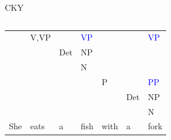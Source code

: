 \documentclass[
	hyperref={unicode},
	xcolor={svgnames, table},
	aspectratio=169,
	french,
]{beamer}
\begin{document}
\begin{frame}{CKY}
\begin{columns}
\begin{column}{0.65\textwidth}
{\begin{table}[]
\begin{tabular}{lllllll}
\multicolumn{1}{l|}{}    & \multicolumn{1}{l|}{\small{V,VP}} & \multicolumn{1}{l|}{}    & \multicolumn{1}{l|}{\textcolor{blue}{VP}} & \multicolumn{1}{l|}{}  & \multicolumn{1}{l|}{}    & \multicolumn{1}{l|}{\textcolor{blue}{VP}}                       \\ \cline{2-7} 
												 & \multicolumn{1}{l|}{}      & \multicolumn{1}{l|}{Det} & \multicolumn{1}{l|}{NP} & \multicolumn{1}{l|}{}  & \multicolumn{1}{l|}{}    & \multicolumn{1}{l|}{}                         \\ \cline{3-7} 
												 &                            & \multicolumn{1}{l|}{}    & \multicolumn{1}{l|}{N}  & \multicolumn{1}{l|}{}  & \multicolumn{1}{l|}{}    & \multicolumn{1}{l|}{}                         \\ \cline{4-7} 
												 &                            &                          & \multicolumn{1}{l|}{}   & \multicolumn{1}{l|}{P} & \multicolumn{1}{l|}{}    & \multicolumn{1}{l|}{\textcolor{blue}{PP}}                       \\ \cline{5-7} 
												 &                            &                          &                         & \multicolumn{1}{l|}{}  & \multicolumn{1}{l|}{Det} & \multicolumn{1}{l|}{NP}                       \\ \cline{6-7} 
												 &                            &                          &                         &                        & \multicolumn{1}{l|}{}    & \multicolumn{1}{l|}{N}                        \\ \cline{7-7} 
She                      & eats                       & a                        & fish                    & with                   & a                        & fork                                         
\end{tabular}
\end{table}
	}


\end{column}
\end{columns}
\end{frame}
\end{document}
